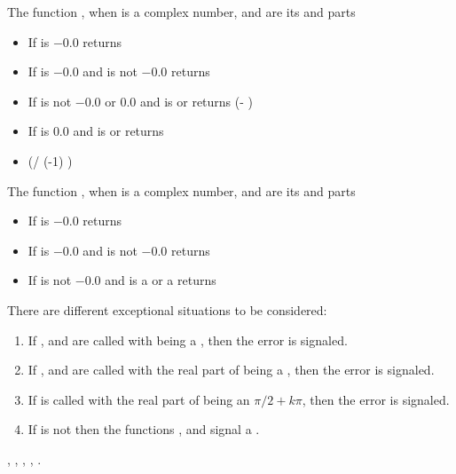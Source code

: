 \documentclass[../Exponentials-Logarithms-Trigonometry.tex]{subfiles}
\begin{document}
\noindent
The function , when  is a complex number, 
and  are its  and  parts
\begin{itemize}
  \item If  is $-0.0$ returns 
  \item If  is $-0.0$ and  is not
$-0.0$ returns \code{)))}
  \item If  is not $-0.0$ or $0.0$ and
   is  or  returns
   \code{)} (- )\code{))}
  \item If  is $0.0$ and  is
   or  returns
  \item {}(/ (-1) )\code{)}
\end{itemize}

\noindent
The function , when  is a complex number, 
and  are its  and  parts
\begin{itemize}
  \item If  is $-0.0$ returns 
  \item If  is $-0.0$ and  is not
$-0.0$ returns \code{))))}
  \item If  is not $-0.0$ and  is a
   or a  returns \code{))}
\end{itemize}

\DExceptional{}

There are different exceptional situations to be considered:
\begin{enumerate}
  \item If ,  and  are called with
     being a , then the
     error is signaled.
  \item If ,  and  are called with the real
    part of  being a , then the
     error is signaled.
  \item If  is called with the real part of
     being an $\pi/2 + k\pi$, then the
     error is signaled.
  \item If  is not \CL{}
     then the functions ,  and
     signal a .
\end{enumerate}

\DSeeAlso{}

\code{*}, \code{-}, , , .
\end{document}
